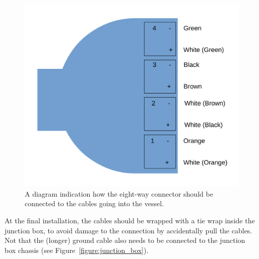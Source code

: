 \begin{figure}
\begin{center}	
  \includegraphics[width=0.5\linewidth]{figures/connector.pdf}
  \caption{A diagram indication how the eight-way connector should be connected to the cables going into the vessel.}
  \label{figure:connector}
\end{center}
\end{figure}

At the final installation, the cables should be wrapped with a tie wrap inside the junction box, to avoid damage to the connection by accidentally pull the cables. Not that the (longer) ground cable also needs to be connected to the junction box chassis (see Figure~\ref{figure:junction_box}).

